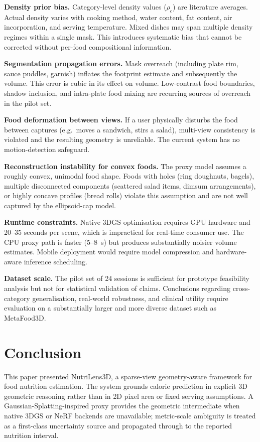 \documentclass[conference]{IEEEtran}
\begin{document}
\textbf{Density prior bias.} Category-level density values ($\rho_c$) are
literature averages. Actual density varies with cooking method, water content,
fat content, air incorporation, and serving temperature. Mixed dishes may span
multiple density regimes within a single mask. This introduces systematic bias
that cannot be corrected without per-food compositional information.

\textbf{Segmentation propagation errors.} Mask overreach (including plate rim,
sauce puddles, garnish) inflates the footprint estimate and subsequently the
volume. This error is cubic in its effect on volume. Low-contrast food
boundaries, shadow inclusion, and intra-plate food mixing are recurring sources
of overreach in the pilot set.

\textbf{Food deformation between views.} If a user physically disturbs the
food between captures (e.g.\ moves a sandwich, stirs a salad), multi-view
consistency is violated and the resulting geometry is unreliable. The current
system has no motion-detection safeguard.

\textbf{Reconstruction instability for convex foods.} The proxy model assumes
a roughly convex, unimodal food shape. Foods with holes (ring doughnuts,
bagels), multiple disconnected components (scattered salad items, dimsum
arrangements), or highly concave profiles (bread rolls) violate this assumption
and are not well captured by the ellipsoid-cap model.

\textbf{Runtime constraints.} Native 3DGS optimisation requires GPU hardware
and 20--35 seconds per scene, which is impractical for real-time consumer
use. The CPU proxy path is faster (5--8~s) but produces substantially noisier
volume estimates. Mobile deployment would require model compression and
hardware-aware inference scheduling.

\textbf{Dataset scale.} The pilot set of 24 sessions is sufficient for
prototype feasibility analysis but not for statistical validation of claims.
Conclusions regarding cross-category generalisation, real-world robustness,
and clinical utility require evaluation on a substantially larger and more
diverse dataset such as MetaFood3D.

\section{Conclusion}

This paper presented NutriLens3D, a sparse-view geometry-aware framework for
food nutrition estimation. The system grounds calorie prediction in explicit
3D geometric reasoning rather than in 2D pixel area or fixed serving
assumptions. A Gaussian-Splatting-inspired proxy provides the geometric
intermediate when native 3DGS or NeRF backends are unavailable; metric-scale
ambiguity is treated as a first-class uncertainty source and propagated
through to the reported nutrition interval.
\end{document}
